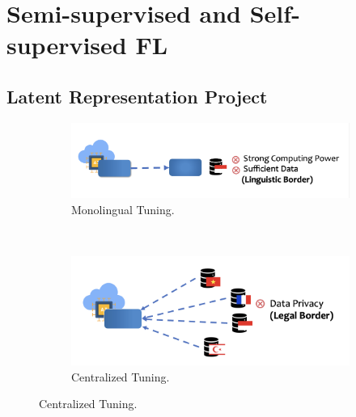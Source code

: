 \documentclass[withindex,glossary,firstyr]{cam-thesis}
\begin{document}



\section{Semi-supervised and Self-supervised FL}
\subsection{Latent Representation Project}

\begin{figure}
    \centering
    \vspace{-1cm}%
    \begin{minipage}{0.49\linewidth}
        \begin{subfigure}[b]{\linewidth}
            \includegraphics[width=\linewidth]{1.jpg}
            \caption{Monolingual Tuning.}
            \label{fig:a}
        \end{subfigure}
        \\
        \begin{subfigure}[b]{\linewidth}
            \includegraphics[width=\linewidth]{2.jpg}
            \caption{Centralized Tuning.}
            \label{fig:b}
        \end{subfigure}
    \end{minipage}

\end{figure}
\end{document}

